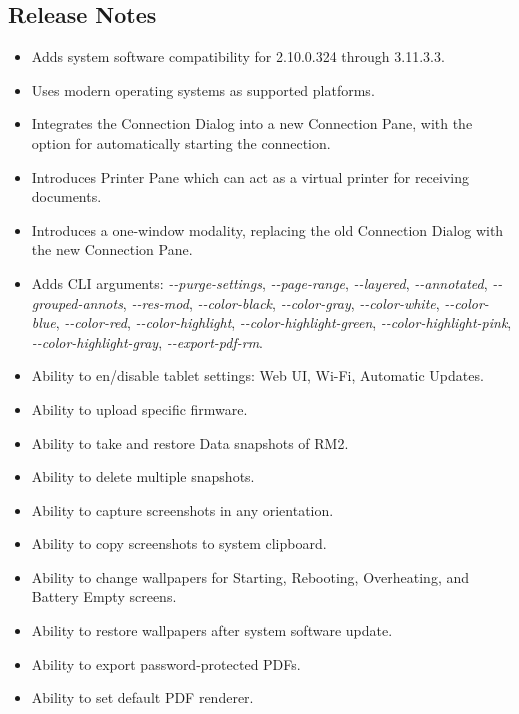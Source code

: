 {\subsection{Release Notes}
\begin{itemize}
  \item{Adds system software compatibility for 2.10.0.324 through 3.11.3.3.}
  \item{Uses modern operating systems as supported platforms.}
  \item{Integrates the Connection Dialog into a new Connection Pane, with the option for automatically starting the connection.}
  \item{Introduces Printer Pane which can act as a virtual printer for receiving documents.}
  \item{Introduces a one-window modality, replacing the old Connection Dialog with the new Connection Pane.}
  \item{Adds CLI arguments: \textit{\--\--purge-settings}, \textit{\--\--page-range}, \textit{\--\--layered}, \textit{\--\--annotated}, \linebreak \textit{\--\--grouped-annots}, \textit{\--\--res-mod}, \textit{\--\--color-black}, \textit{\--\--color-gray}, \textit{\--\--color-white}, \textit{\--\--color-blue}, \linebreak \textit{\--\--color-red}, \textit{\--\--color-highlight}, \textit{\--\--color-highlight-green}, \textit{\--\--color-highlight-pink}, \linebreak \textit{\--\--color-highlight-gray}, \textit{\--\--export-pdf-rm}.}
  \item{Ability to en/disable tablet settings: Web UI, Wi-Fi, Automatic Updates.}
  \item{Ability to upload specific firmware.}
  \item{Ability to take and restore Data snapshots of RM2.}
  \item{Ability to delete multiple snapshots.}
  \item{Ability to capture screenshots in any orientation.}
  \item{Ability to copy screenshots to system clipboard.}
  \item{Ability to change wallpapers for Starting, Rebooting, Overheating, and Battery Empty screens.}
  \item{Ability to restore wallpapers after system software update.}
  \item{Ability to export password-protected PDFs.}
  \item{Ability to set default PDF renderer.}

\end{itemize}}
